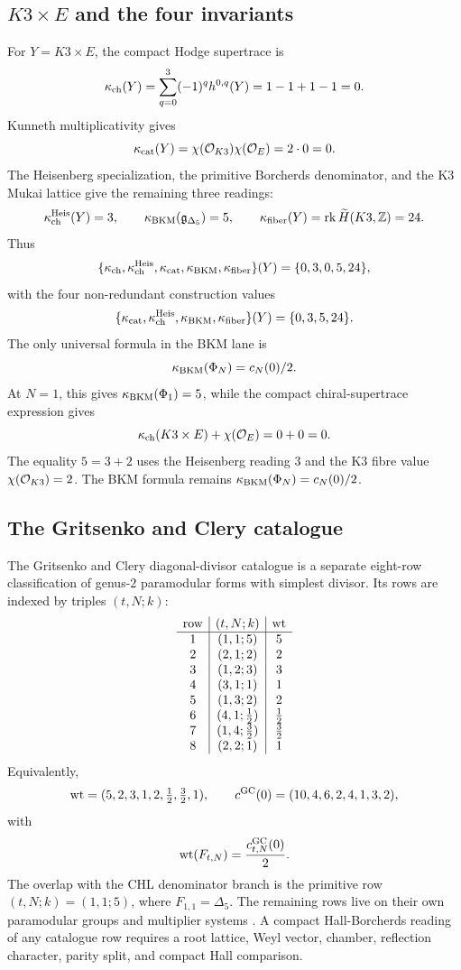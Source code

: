\subsection{\texorpdfstring{\(K3\times E\)}{K3 x E} and the four invariants}
\label{subsec:lorgat-conjecture-one-k3xe-invariants}

For \(Y=K3\times E\), the compact Hodge supertrace is
\[
  \kappa_{\mathrm{ch}}(Y)=\sum_{q=0}^{3}(-1)^q h^{0,q}(Y)
  =1-1+1-1=0.
\]
Kunneth multiplicativity gives
\[
  \kappa_{\mathrm{cat}}(Y)=\chi(\mathcal{O}_{K3})\chi(\mathcal{O}_E)=2\cdot0=0.
\]
The Heisenberg specialization, the primitive Borcherds denominator, and
the K3 Mukai lattice give the remaining three readings:
\[
  \kappa_{\mathrm{ch}}^{\mathrm{Heis}}(Y)=3,\qquad
  \kappa_{\mathrm{BKM}}(\mathfrak{g}_{\Delta_5})=5,\qquad
  \kappa_{\mathrm{fiber}}(Y)=\operatorname{rk}\widetilde H(K3,\mathbb Z)=24.
\]
Thus
\[
  \{\kappa_{\mathrm{ch}},\kappa_{\mathrm{ch}}^{\mathrm{Heis}},\kappa_{\mathrm{cat}},\kappa_{\mathrm{BKM}},\kappa_{\mathrm{fiber}}\}(Y)
  =
  \{0,3,0,5,24\},
\]
with the four non-redundant construction values
\[
  \{\kappa_{\mathrm{cat}},\kappa_{\mathrm{ch}}^{\mathrm{Heis}},\kappa_{\mathrm{BKM}},\kappa_{\mathrm{fiber}}\}(Y)
  =
  \{0,3,5,24\}.
\]
The only universal formula in the BKM lane is
\[
  \kappa_{\mathrm{BKM}}(\Phi_N)=c_N(0)/2.
\]
At \(N=1\), this gives \(\kappa_{\mathrm{BKM}}(\Phi_1)=5\), while the compact
chiral-supertrace expression gives
\[
  \kappa_{\mathrm{ch}}(K3\times E)+\chi(\mathcal{O}_E)=0+0=0.
\]
The equality \(5=3+2\) uses the Heisenberg reading \(3\) and the
K3 fibre value \(\chi(\mathcal{O}_{K3})=2\). The BKM formula remains
\(\kappa_{\mathrm{BKM}}(\Phi_N)=c_N(0)/2\).

\subsection{The Gritsenko and Clery catalogue}
\label{subsec:lorgat-conjecture-one-gc-catalogue}

The Gritsenko and Clery diagonal-divisor catalogue is a separate
eight-row classification of genus-\(2\) paramodular forms with simplest
divisor. Its rows are indexed by triples \((t,N;k)\):
\[
\begin{array}{c|c|c}
\mathrm{row} & (t,N;k) & \operatorname{wt} \\ \hline
1 & (1,1;5) & 5 \\
2 & (2,1;2) & 2 \\
3 & (1,2;3) & 3 \\
4 & (3,1;1) & 1 \\
5 & (1,3;2) & 2 \\
6 & (4,1;\tfrac12) & \tfrac12 \\
7 & (1,4;\tfrac32) & \tfrac32 \\
8 & (2,2;1) & 1
\end{array}
\]
Equivalently,
\[
  \operatorname{wt}=(5,2,3,1,2,\tfrac12,\tfrac32,1),
  \qquad
  c^{\mathrm{GC}}(0)=(10,4,6,2,4,1,3,2),
\]
with
\[
  \operatorname{wt}(F_{t,N})=\frac{c^{\mathrm{GC}}_{t,N}(0)}{2}.
\]
The overlap with the CHL denominator branch is the primitive row
\((t,N;k)=(1,1;5)\), where \(F_{1,1}=\Delta_5\). The remaining rows
live on their own paramodular groups and multiplier systems
\cite{GritsenkoClery2013}. A compact Hall-Borcherds reading of any
catalogue row requires a root lattice, Weyl vector, chamber, reflection
character, parity split, and compact Hall comparison.

